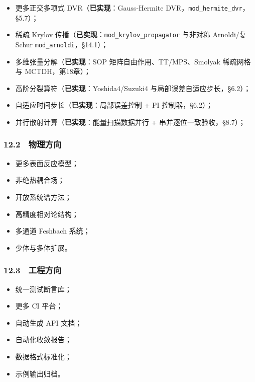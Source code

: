 \documentclass[
]{ctexbook}
\providecommand{\tightlist}{%
  \setlength{\itemsep}{0pt}\setlength{\parskip}{0pt}}
\begin{document}
\begin{itemize}
\tightlist
\item
  更多正交多项式 DVR（\textbf{已实现}：Gauss-Hermite
  DVR，\texttt{mod\_hermite\_dvr}，§5.7）；
\item
  稀疏 Krylov 传播（\textbf{已实现}：\texttt{mod\_krylov\_propagator}
  与非对称 Arnoldi/复 Schur \texttt{mod\_arnoldi}，§14.1）；
\item
  多维张量分解（\textbf{已实现}：SOP 矩阵自由作用、TT/MPS、Smolyak
  稀疏网格与 MCTDH，第18章）；
\item
  高阶分裂算符（\textbf{已实现}：Yoshida4/Suzuki4
  与局部误差自适应步长，§6.2）；
\item
  自适应时间步长（\textbf{已实现}：局部误差控制 + PI 控制器，§6.2）；
\item
  并行散射计算（\textbf{已实现}：能量扫描数据并行 +
  串并逐位一致验收，§8.7）；
\end{itemize}

\hypertarget{ux7269ux7406ux65b9ux5411}{%
\subsubsection{12.2　物理方向}\label{ux7269ux7406ux65b9ux5411}}

\begin{itemize}
\tightlist
\item
  更多表面反应模型；
\item
  非绝热耦合场；
\item
  开放系统谱方法；
\item
  高精度相对论结构；
\item
  多通道 Feshbach 系统；
\item
  少体与多体扩展。
\end{itemize}

\hypertarget{ux5de5ux7a0bux65b9ux5411}{%
\subsubsection{12.3　工程方向}\label{ux5de5ux7a0bux65b9ux5411}}

\begin{itemize}
\tightlist
\item
  统一测试断言库；
\item
  更多 CI 平台；
\item
  自动生成 API 文档；
\item
  自动化收敛报告；
\item
  数据格式标准化；
\item
  示例输出归档。
\end{itemize}
\end{document}
